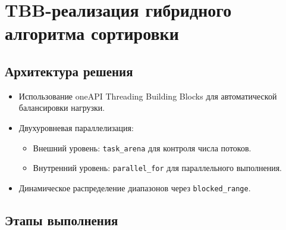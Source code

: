 \documentclass[a4paper,14pt]{extarticle}
\begin{document}
\section*{TBB-реализация гибридного алгоритма сортировки}

\subsection*{Архитектура решения}
\begin{itemize}[leftmargin=*]
    \item Использование oneAPI Threading Building Blocks для автоматической балансировки нагрузки.
    \item Двухуровневая параллелизация:
    \begin{itemize}
        \item Внешний уровень: \texttt{task\_arena} для контроля числа потоков.
        \item Внутренний уровень: \texttt{parallel\_for} для параллельного выполнения.
    \end{itemize}
    \item Динамическое распределение диапазонов через \texttt{blocked\_range}.
\end{itemize}

\subsection*{Этапы выполнения}
\end{document}
